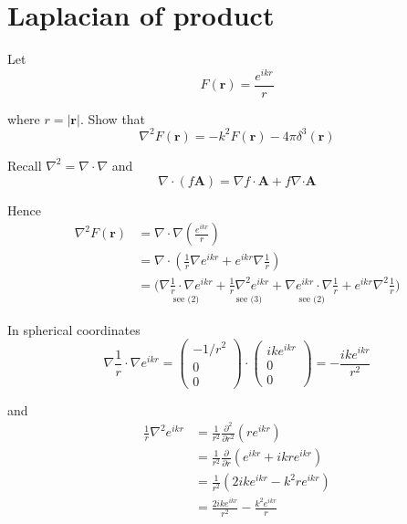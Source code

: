 


\section*{Laplacian of product}

Let 
\begin{equation*}
F(\mathbf r)=\frac{e^{ikr}}{r}
\end{equation*}

where $r=|\mathbf r|$.
Show that
\begin{equation*}
\nabla^2F(\mathbf r)=-k^2F(\mathbf r)-4\pi\delta^3(\mathbf r)
\end{equation*}

Recall $\nabla^2=\nabla\cdot\nabla$ and
\begin{equation*}
\nabla\cdot(f\mathbf A)=\nabla f\cdot\mathbf A+f\nabla\mathbf\cdot\mathbf A
\end{equation*}

Hence
\begin{align*}
\nabla^2F(\mathbf r)
&=\nabla\cdot\nabla\left(\frac{e^{ikr}}{r}\right)
\\
&=\nabla\cdot\left(\frac{1}{r}\nabla e^{ikr}+e^{ikr}\nabla\frac{1}{r}\right)
\\
&=\biggl(
\underset{\text{see (2)}}{\nabla\frac{1}{r}\cdot\nabla e^{ikr}}
+\underset{\text{see (3)}}{\frac{1}{r}\nabla^2e^{ikr}}
+\underset{\text{see (2)}}{\nabla e^{ikr}\cdot\nabla\frac{1}{r}}
+e^{ikr}\nabla^2\frac{1}{r}
\biggr)\tag{1}
\end{align*}

In spherical coordinates
\begin{equation*}
\nabla\frac{1}{r}\cdot\nabla e^{ikr}
=\begin{pmatrix}-1/r^2\\0\\0\end{pmatrix}
\cdot\begin{pmatrix}ike^{ikr}\\0\\0\end{pmatrix}
=-\frac{ike^{ikr}}{r^2}\tag{2}
\end{equation*}

and
\begin{align*}
\frac{1}{r}\nabla^2e^{ikr}&=\frac{1}{r^2}\frac{\partial^2}{\partial r^2}(re^{ikr})
\\
&=\frac{1}{r^2}\frac{\partial}{\partial r}\left(e^{ikr}+ikre^{ikr}\right)
\\
&=\frac{1}{r^2}\left(2ike^{ikr}-k^2re^{ikr}\right)
\\
&=\frac{2ike^{ikr}}{r^2}-\frac{k^2e^{ikr}}{r}\tag{3}
\end{align*}

